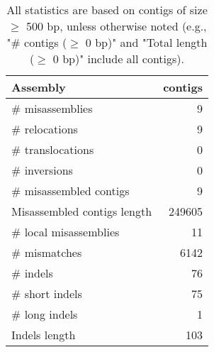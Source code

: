 \documentclass[12pt,a4paper]{article}
\begin{document}
\begin{table}[ht]
\begin{center}
\caption{All statistics are based on contigs of size $\geq$ 500 bp, unless otherwise noted (e.g., "\# contigs ($\geq$ 0 bp)" and "Total length ($\geq$ 0 bp)" include all contigs).}
\begin{tabular}{|l*{1}{|r}|}
\hline
Assembly & contigs \\ \hline
\# misassemblies & 9 \\ \hline
\hspace{5mm}\# relocations & 9 \\ \hline
\hspace{5mm}\# translocations & 0 \\ \hline
\hspace{5mm}\# inversions & 0 \\ \hline
\# misassembled contigs & 9 \\ \hline
Misassembled contigs length & 249605 \\ \hline
\# local misassemblies & 11 \\ \hline
\# mismatches & 6142 \\ \hline
\# indels & 76 \\ \hline
\hspace{5mm}\# short indels & 75 \\ \hline
\hspace{5mm}\# long indels & 1 \\ \hline
Indels length & 103 \\ \hline
\end{tabular}
\end{center}
\end{table}
\end{document}
